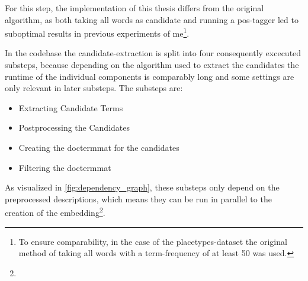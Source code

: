 For this step, the implementation of this thesis differs from the original algorithm, as both taking all words as candidate and running a \gls{pos}-tagger led to suboptimal results in previous experiments of me\footnote{To ensure comparability, in the case of the placetypes-dataset the original method of taking all words with a term-frequency of at least 50 was used.}. 

In the codebase the candidate-extraction is split into four consequently excecuted substeps, because depending on the algorithm used to extract the candidates the runtime of the individual components is comparably long and some settings are only relevant in later substeps. The substeps are:
\begin{itemize}
	\item Extracting Candidate Terms
	\item Postprocessing the Candidates
	\item Creating the \gls{doctermmat} for the candidates
	\item Filtering the \gls{doctermmat}
\end{itemize}

As visualized in \autoref{fig:dependency_graph}, these substeps only depend on the preprocessed descriptions, which means they can be run in parallel to the creation of the embedding\footnote{}.

